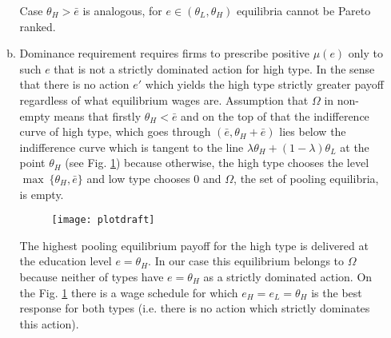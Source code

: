 \documentclass[a4paper]{article}
\begin{document}
\begin{enumerate}
\begin{enumerate}[(a)]
Case $\theta_H > \bar{e}$ is analogous, for $e \in (\theta_L, \theta_H)$ equilibria cannot be Pareto ranked.
\item Dominance requirement requires firms to prescribe positive $\mu(e)$ only to such $e$ that is not a strictly dominated action for high type. In the sense that there is no action $e'$ which yields the high type strictly greater payoff regardless of what equilibrium wages are. Assumption that $\Omega$ in non-empty means that firstly $\theta_H < \bar{e}$ and on the top of that the indifference curve of high type, which goes through $(\bar{e}, \theta_H + \bar{e})$ lies below the indifference curve which is tangent to the line $\lambda \theta_H + (1 - \lambda) \theta_L$ at the point $\theta_H$ (see Fig. \ref{fig6}) because otherwise, the high type chooses the level $\max\ \{\theta_H, \bar{e}\}$ and low type chooses $0$ and $\Omega$, the set of pooling equilibria, is empty.
	\begin{figure}[H]
	\centering
	\texttt{[image: plotdraft]}
	\caption{}\label{fig6}
\end{figure} 
The highest pooling equilibrium payoff for the high type is delivered at the education level $e = \theta_H$. In our case this equilibrium belongs to $\Omega$ because neither of types have $e = \theta_H$ as a strictly dominated action. On the Fig. \ref{fig6} there is a wage schedule for which $e_H = e_L = \theta_H$ is the best response for both types (i.e. there is no action which strictly dominates this action).
	\end{enumerate}
\end{enumerate}
\end{document}
